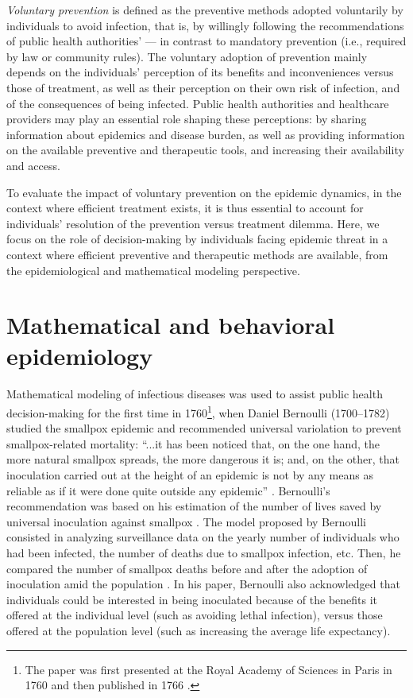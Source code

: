 \textit{Voluntary prevention} is defined as the preventive methods adopted voluntarily by individuals to avoid infection, that is, by willingly following the recommendations of public health authorities' --- in contrast to mandatory prevention (i.e., required by law or community rules). The voluntary adoption of prevention mainly depends on the individuals' perception of its benefits and inconveniences versus those of treatment, as well as their perception on their own risk of infection, and of the consequences of being infected. Public health authorities and healthcare providers may play an essential role shaping these perceptions: by sharing information about epidemics and disease burden, as well as providing information on the available preventive and therapeutic tools, and increasing their availability and access.%

To evaluate the impact of voluntary prevention on the epidemic dynamics, in the context where efficient treatment exists, it is thus essential to account for individuals' resolution of the prevention versus treatment dilemma. Here, we focus on the role of decision-making by individuals facing epidemic threat in a context where efficient preventive and therapeutic methods are available, from the epidemiological and mathematical modeling perspective.

\section{Mathematical and behavioral epidemiology}
\label{Intro:BehavEpi} 

Mathematical modeling of infectious diseases was used to assist public health decision-making for the first time in 1760\footnote{The paper was first presented at the Royal Academy of Sciences in Paris in 1760 and then published in 1766 \cite[]{Bernoulli1766}.}, when Daniel Bernoulli (1700--1782) studied the smallpox epidemic and recommended universal variolation to prevent smallpox-related mortality: ``...it has been noticed that, on the one hand, the more natural smallpox spreads, the more dangerous it is; and, on the other, that inoculation carried out at the height of an epidemic is not by any means as reliable as if it were done quite outside any epidemic'' \cite[]{Blower2004}. Bernoulli's recommendation was based on his estimation of the number of lives saved by universal inoculation against smallpox \cite[]{Blower2004}. The model proposed by Bernoulli consisted in analyzing surveillance data on the yearly number of individuals who had been infected, the number of deaths due to smallpox infection, etc. Then, he compared the number of smallpox deaths before and after the adoption of inoculation amid the population \cite[]{Blower2004,Dietz2002}. In his paper, Bernoulli also acknowledged that individuals could be interested in being inoculated because of the benefits it offered at the individual level (such as avoiding lethal infection), versus those offered at the population level (such as increasing the average life expectancy).

